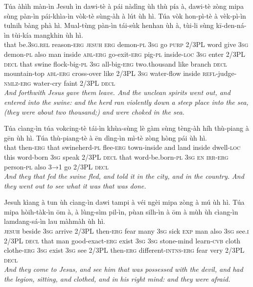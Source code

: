 \documentclass[11pt,a4paper]{article}
\begin{document}
\begin{exe}
\gll Túa àhìh màn-ìn Jesuh ìn dawi-tè à pái nàdìng ùh thù pía à, dawi-tè zòng mipa sùng pàn-ìn pái-khìa-ìn vòk-tè sùng-àh à lút ùh hì. Túa vòk hon-pì-tè à vèk-pì-ìn tulnih bàng phà hì. Mual-tùng pàn-ìn tái-sùk henhan ùh à, tùi-li sùng kī-den-ná-ìn tùi-kía mangkhin ùh hì. \\
     that be.\textsc{3sg}.\textsc{rel} reason-\textsc{erg} \textsc{jesuh} \textsc{erg} demon-\textsc{pl} \textsc{3sg} go \textsc{purp} 2/3PL word give \textsc{3sg} demon-\textsc{pl} also man inside \textsc{abl}-\textsc{erg} go-exit-\textsc{erg} pig-\textsc{pl} inside-\textsc{loc} \textsc{3sg} enter 2/3PL \textsc{decl} that swine flock-big-\textsc{pl} \textsc{3sg} all-big-\textsc{erg} two.thousand like branch \textsc{decl} mountain-top \textsc{abl}-\textsc{erg} cross-over like 2/3PL \textsc{3sg} water-flow inside \textsc{refl}-judge-\textsc{nmlz}-\textsc{erg} water-cry faint 2/3PL \textsc{decl} \\
\glt \textcolor{kjvcolor}{\textit{And forthwith Jesus gave them leave. And the unclean spirits went out, and entered into the swine: and the herd ran violently down a steep place into the sea, (they were about two thousand;) and were choked in the sea.}}

\gll Túa cìang-ìn túa vokcing-tè tái-ìn khùa-sùng lè gàm sùng tèng-àh híh thù-piang à gēn ùh hì. Túa thù-piang-tè à ēn dìng-ìn mì-tè zòng hòng pái ùh hì. \\
     that then-\textsc{erg} that swineherd-\textsc{pl} flee-\textsc{erg} town-inside and land inside dwell-\textsc{loc} this word-born \textsc{3sg} speak 2/3PL \textsc{decl} that word-be.born-\textsc{pl} \textsc{3sg} \textsc{en} \textsc{irr}-\textsc{erg} person-\textsc{pl} also \textsc{3→1} go 2/3PL \textsc{decl} \\
\glt \textcolor{kjvcolor}{\textit{And they that fed the swine fled, and told it in the city, and in the country. And they went out to see what it was that was done.}}

\gll Jesuh kìang à tun ùh cìang-ìn dawi tampi à véi ngèi mipa zòng à mú ùh hì. Túa mipa hòih-tàk-ìn ōm à, à lùng-sìm pil-ìn, pùan silh-ìn à ōm à mùh ùh cìang-ìn lamdang-sá-ìn lau màhmàh ùh hì. \\
     \textsc{jesuh} beside \textsc{3sg} arrive 2/3PL then-\textsc{erg} fear many \textsc{3sg} sick \textsc{exp} man also \textsc{3sg} see.\textsc{i} 2/3PL \textsc{decl} that man good-exact-\textsc{erg} exist \textsc{3sg} \textsc{3sg} stone-mind learn-\textsc{cvb} cloth clothe-\textsc{erg} \textsc{3sg} exist \textsc{3sg} see 2/3PL then-\textsc{erg} different-\textsc{intns}-\textsc{erg} fear very 2/3PL \textsc{decl} \\
\glt \textcolor{kjvcolor}{\textit{And they come to Jesus, and see him that was possessed with the devil, and had the legion, sitting, and clothed, and in his right mind: and they were afraid.}}


\end{exe}
\end{document}
